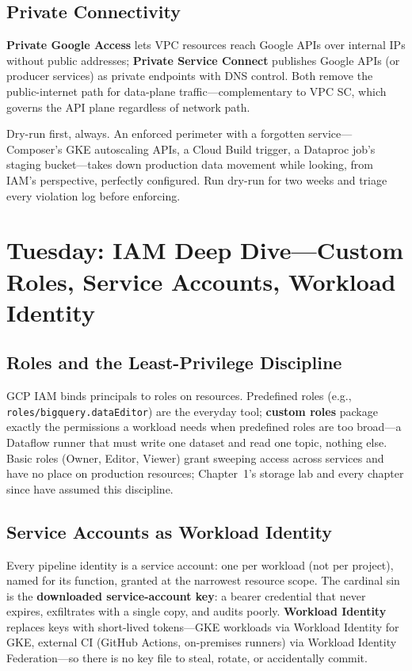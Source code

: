 \subsection{Private Connectivity}
\textbf{Private Google Access} lets VPC resources reach Google APIs over internal IPs without public addresses; \textbf{Private Service Connect} publishes Google APIs (or producer services) as private endpoints with DNS control. Both remove the public-internet path for data-plane traffic---complementary to VPC SC, which governs the API plane regardless of network path.

\begin{pitfall}
Dry-run first, always. An enforced perimeter with a forgotten service---Composer's GKE autoscaling APIs, a Cloud Build trigger, a Dataproc job's staging bucket---takes down production data movement while looking, from IAM's perspective, perfectly configured. Run dry-run for two weeks and triage every violation log before enforcing.
\end{pitfall}

\section{Tuesday: IAM Deep Dive---Custom Roles, Service Accounts, Workload Identity}

\subsection{Roles and the Least-Privilege Discipline}
GCP IAM binds principals to roles on resources. Predefined roles (e.g., \texttt{roles/bigquery.dataEditor}) are the everyday tool; \textbf{custom roles} package exactly the permissions a workload needs when predefined roles are too broad---a Dataflow runner that must write one dataset and read one topic, nothing else. Basic roles (Owner, Editor, Viewer) grant sweeping access across services and have no place on production resources; Chapter~1's storage lab and every chapter since have assumed this discipline.

\subsection{Service Accounts as Workload Identity}
Every pipeline identity is a service account: one per workload (not per project), named for its function, granted at the narrowest resource scope. The cardinal sin is the \textbf{downloaded service-account key}: a bearer credential that never expires, exfiltrates with a single copy, and audits poorly. \textbf{Workload Identity} replaces keys with short-lived tokens---GKE workloads via Workload Identity for GKE, external CI (GitHub Actions, on-premises runners) via Workload Identity Federation---so there is no key file to steal, rotate, or accidentally commit.


